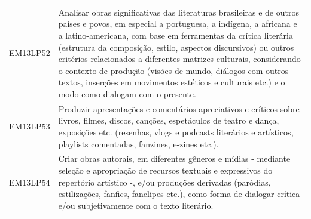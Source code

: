 \documentclass[12pt]{extarticle}
\begin{document}
\begin{longtable}{ll}
EM13LP52   & Analisar obras significativas das literaturas brasileiras e de outros países e povos, em especial a portuguesa, a indígena, a africana e a latino-americana, com base em ferramentas da crítica literária (estrutura da composição, estilo, aspectos discursivos) ou outros critérios relacionados a diferentes matrizes culturais, considerando o contexto de produção (visões de mundo, diálogos com outros textos, inserções em movimentos estéticos e culturais etc.) e o modo como dialogam com o presente.                                                                                                                                                                                                                                                                                                      \\
\rowcolor[HTML]{E0F7FA} 
EM13LP53   & Produzir apresentações e comentários apreciativos e críticos sobre livros, filmes, discos, canções, espetáculos de teatro e dança, exposições etc. (resenhas, vlogs e podcasts literários e artísticos, playlists comentadas, fanzines, e-zines etc.).                                                                                                                                                                                                                                                                                                                                                                                                                                                                                                                                                                \\
\rowcolor[HTML]{FFF} 
EM13LP54   & Criar obras autorais, em diferentes gêneros e mídias - mediante seleção e apropriação de recursos textuais e expressivos do repertório artístico -, e/ou produções derivadas (paródias, estilizações, fanfics, fanclipes etc.), como forma de dialogar crítica e/ou subjetivamente com o texto literário.                                                                                                                                                                             
\end{longtable}
\end{document}
